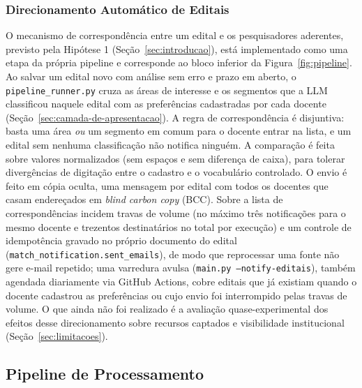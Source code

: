 \documentclass[12pt]{article}
\begin{document}
  \subsubsection{Direcionamento Automático de Editais}\label{sec:direcionamento-automatico-de-editais}
  O mecanismo de correspondência entre um edital e os pesquisadores aderentes, previsto pela Hipótese 1 (Seção~\ref{sec:introducao}), está implementado como uma etapa da própria pipeline e corresponde ao bloco inferior da Figura~\ref{fig:pipeline}. Ao salvar um edital novo com análise sem erro e prazo em aberto, o \texttt{pipeline\_runner.py} cruza as áreas de interesse e os segmentos que a LLM classificou naquele edital com as preferências cadastradas por cada docente (Seção~\ref{sec:camada-de-apresentacao}). A regra de correspondência é disjuntiva: basta uma área \emph{ou} um segmento em comum para o docente entrar na lista, e um edital sem nenhuma classificação não notifica ninguém. A comparação é feita sobre valores normalizados (sem espaços e sem diferença de caixa), para tolerar divergências de digitação entre o cadastro e o vocabulário controlado. O envio é feito em cópia oculta, uma mensagem por edital com todos os docentes que casam endereçados em \emph{blind carbon copy} (BCC). Sobre a lista de correspondências incidem travas de volume (no máximo três notificações para o mesmo docente e trezentos destinatários no total por execução) e um controle de idempotência gravado no próprio documento do edital (\texttt{match\_notification.sent\_emails}), de modo que reprocessar uma fonte não gere e-mail repetido; uma varredura avulsa (\texttt{main.py --notify-editais}), também agendada diariamente via GitHub Actions, cobre editais que já existiam quando o docente cadastrou as preferências ou cujo envio foi interrompido pelas travas de volume. O que ainda não foi realizado é a avaliação quase-experimental dos efeitos desse direcionamento sobre recursos captados e visibilidade institucional (Seção~\ref{sec:limitacoes}).

  \subsection{Pipeline de Processamento}\label{sec:pipeline-de-processamento}
\end{document}
